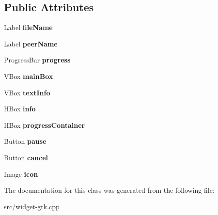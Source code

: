 \subsection*{\-Public \-Attributes}
\begin{DoxyCompactItemize}
\item 
\hypertarget{classSimpleFileInfoRenderer_ad94405d33c6581d6fca59655806f6df6}{\-Label {\bfseries file\-Name}}\label{classSimpleFileInfoRenderer_ad94405d33c6581d6fca59655806f6df6}

\item 
\hypertarget{classSimpleFileInfoRenderer_a945146b01d5f22f0b655e6374bad7004}{\-Label {\bfseries peer\-Name}}\label{classSimpleFileInfoRenderer_a945146b01d5f22f0b655e6374bad7004}

\item 
\hypertarget{classSimpleFileInfoRenderer_ad1a4e05eaecda92b520383b7fb5803f7}{\-Progress\-Bar {\bfseries progress}}\label{classSimpleFileInfoRenderer_ad1a4e05eaecda92b520383b7fb5803f7}

\item 
\hypertarget{classSimpleFileInfoRenderer_af86fb59b276bb0fb1e63c7ec79b86f61}{\-V\-Box {\bfseries main\-Box}}\label{classSimpleFileInfoRenderer_af86fb59b276bb0fb1e63c7ec79b86f61}

\item 
\hypertarget{classSimpleFileInfoRenderer_a01858924969ce4da7fdc36ad93e2036d}{\-V\-Box {\bfseries text\-Info}}\label{classSimpleFileInfoRenderer_a01858924969ce4da7fdc36ad93e2036d}

\item 
\hypertarget{classSimpleFileInfoRenderer_a50e3e96c14d2f5761710a3052ecb1b7a}{\-H\-Box {\bfseries info}}\label{classSimpleFileInfoRenderer_a50e3e96c14d2f5761710a3052ecb1b7a}

\item 
\hypertarget{classSimpleFileInfoRenderer_a2358b5dbfc90c70d42ff9a0730fa1dcd}{\-H\-Box {\bfseries progress\-Container}}\label{classSimpleFileInfoRenderer_a2358b5dbfc90c70d42ff9a0730fa1dcd}

\item 
\hypertarget{classSimpleFileInfoRenderer_acc18941c132171728955fd7b9dcca287}{\-Button {\bfseries pause}}\label{classSimpleFileInfoRenderer_acc18941c132171728955fd7b9dcca287}

\item 
\hypertarget{classSimpleFileInfoRenderer_a52d8148f6623cc24b8b6534cfc8d634f}{\-Button {\bfseries cancel}}\label{classSimpleFileInfoRenderer_a52d8148f6623cc24b8b6534cfc8d634f}

\item 
\hypertarget{classSimpleFileInfoRenderer_a03331db3ce93eecbf8e290bc3218e664}{\-Image {\bfseries icon}}\label{classSimpleFileInfoRenderer_a03331db3ce93eecbf8e290bc3218e664}

\end{DoxyCompactItemize}


\-The documentation for this class was generated from the following file\-:\begin{DoxyCompactItemize}
\item 
src/widget-\/gtk.\-cpp\end{DoxyCompactItemize}

